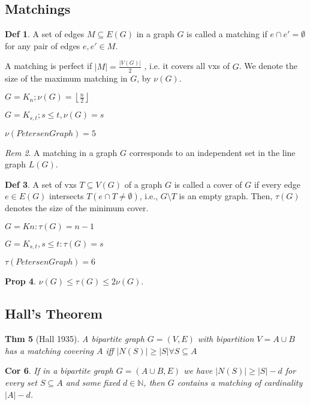\documentclass[11pt, fleqn, a4paper, landscape]{article}
\theoremstyle{plain} %
\newtheorem{thm}{Thm}
\newtheorem{pro}[thm]{Prop}
\newtheorem{cor}[thm]{Cor}
\theoremstyle{remark} %
\newtheorem{rem}[thm]{Rem}
\theoremstyle{definition} %
\newtheorem{defi}[thm]{Def}
\begin{document}
\begin{multicols}{5}
\section{Matchings}
\begin{defi}
A set of edges $M \subseteq E(G)$ in a graph $G$ is called a matching if $e \cap e' = \emptyset$ for any pair of edges $e, e' \in M$.

A matching is perfect if $|M|=\frac{|V (G)|}{2}$ , i.e. it covers all vxs of $G$. We denote the size of the maximum matching in $G$, by $\nu(G)$.

$G=K_n; \nu(G)=\left\lfloor\frac{n}{2}\right\rfloor$

$G=K_{s,t}; s\le t, \nu(G)=s$

$\nu(Petersen Graph)=5$
\end{defi}
\addtocounter{thm}{1}
\begin{rem}
A matching in a graph $G$ corresponds to an independent set in the line graph $L(G)$.
\end{rem}
\begin{defi}
A set of vxs $T \subseteq V (G)$ of a graph  $G$ is called a cover of $G$ if every edge $e \in E(G)$ intersects $T (e \cap T \neq \emptyset)$, i.e., $G \setminus T$ is an empty graph. Then, $\tau(G)$ denotes the size of
the minimum cover.

$G = Kn: \tau(G) = n - 1$

$G = K_{s,t}, s \le t: \tau(G) = s$

$\tau(Petersen Graph)=6$
\end{defi}
\addtocounter{thm}{1}
\begin{pro}
$\nu(G) \le\tau(G) \le 2\nu(G).$
\end{pro}
\addtocounter{subsection}{1}
\subsection{Hall’s Theorem}
\begin{thm}[Hall 1935]
A bipartite graph $G = (V,E)$ with bipartition $V = A\cup B$ has a matching
covering $A$ iff $|N(S)|\ge|S|\forall S \subseteq A$
\end{thm}

\begin{cor}
 If in a bipartite graph $G = (A\cup B,E)$ we have $|N(S)|\ge|S|-d$ for every set $S \subseteq A$ and some fixed $d\in\mathbb{N}$, then $G$ contains a matching of cardinality $|A|- d$.
\end{cor}


\end{multicols}
\end{document}
